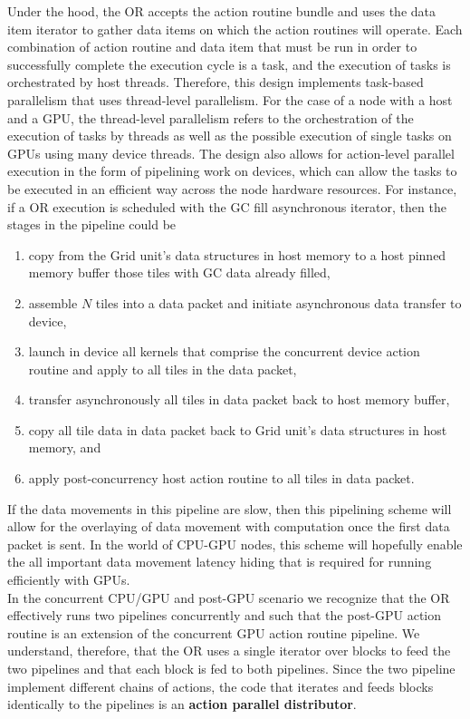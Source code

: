 \documentclass{article}
\newcommand{\shortOR}   {OR\xspace}
\newcommand{\OR}        {\shortOR}
\newcommand{\actionroutine}        {action routine\xspace}       %
\begin{document}
Under the hood, the \OR accepts the action routine bundle and uses the data item
iterator to gather data items on which the action routines will operate.  Each
combination of action routine and data item that must be run in order to
successfully complete the execution cycle is a task, and the execution of tasks
is orchestrated by host threads.  Therefore, this design implements task-based
parallelism that uses thread-level parallelism.  For the case of a node with a
host and a GPU, the thread-level parallelism refers to the orchestration of the
execution of tasks by threads as well as the possible execution of single tasks
on GPUs using many device threads.  The design
also allows for action-level parallel execution in the form of pipelining
work on devices, which can allow the tasks to be executed in an efficient way
across the node hardware resources.  For instance, if a \OR execution is
scheduled with the GC fill asynchronous iterator, then the stages in the
pipeline could be
\begin{enumerate}
\item{copy from the Grid unit's data structures in host memory to a host pinned memory
buffer those tiles with GC data already filled,}
\item{assemble $N$ tiles into a data packet and initiate asynchronous data
transfer to device,}
\item{launch in device all kernels that comprise the concurrent device \actionroutine and
apply to all tiles in the data packet,}
\item{transfer asynchronously all tiles in data packet back to host memory
buffer,}
\item{copy all tile data in data packet back to Grid unit's data structures in
host memory, and}
\item{apply post-concurrency host \actionroutine to all tiles in data packet.}
\end{enumerate}
If the data movements in this pipeline are slow, then this pipelining scheme
will allow for the overlaying of data movement with computation once the first
data packet is sent.  In the world of CPU-GPU nodes, this scheme will hopefully
enable the all important data movement latency hiding that is required for running efficiently
with GPUs.\\

In the concurrent CPU/GPU and post-GPU scenario we recognize that the \OR
effectively runs two pipelines concurrently and such that the post-GPU \actionroutine is
an extension of the concurrent GPU \actionroutine pipeline.  We understand, therefore,
that the \OR uses a single iterator over blocks to feed the two pipelines
and that each block is fed to both pipelines.  Since the two pipeline implement
different chains of actions, the code that iterates and feeds
blocks identically to the pipelines is an \textbf{action parallel distributor}.\\
\end{document}
